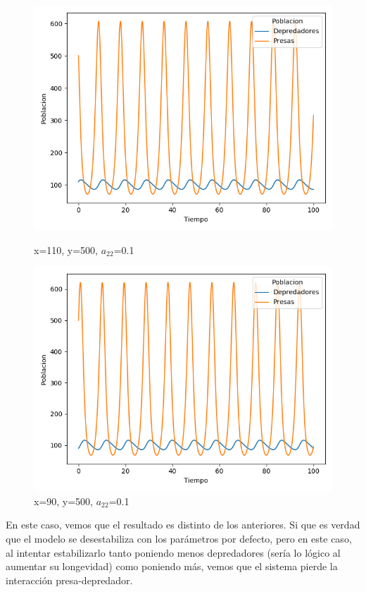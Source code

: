 \documentclass[11pt,a4paper]{article}
\begin{document}
\begin{figure}[H]
	\centering
	\begin{minipage}{0.5\textwidth}
		\centering
		\includegraphics[scale=0.4]{img/4-a22-110-500.png}
		\caption{x=110, y=500, $a_{22}$=0.1}
	\end{minipage}%
	\begin{minipage}{0.5\textwidth}
		\centering
		\includegraphics[scale=0.4]{img/4-a22-90-500.png}
		\caption{x=90, y=500, $a_{22}$=0.1}
	\end{minipage}
\end{figure}

En este caso, vemos que el resultado es distinto de los anteriores. Si que es verdad que el modelo se desestabiliza con los parámetros por defecto,
pero en este caso, al intentar estabilizarlo tanto poniendo menos depredadores (sería lo lógico al aumentar su longevidad) como poniendo más, vemos
que el sistema pierde la interacción presa-depredador.
\end{document}
